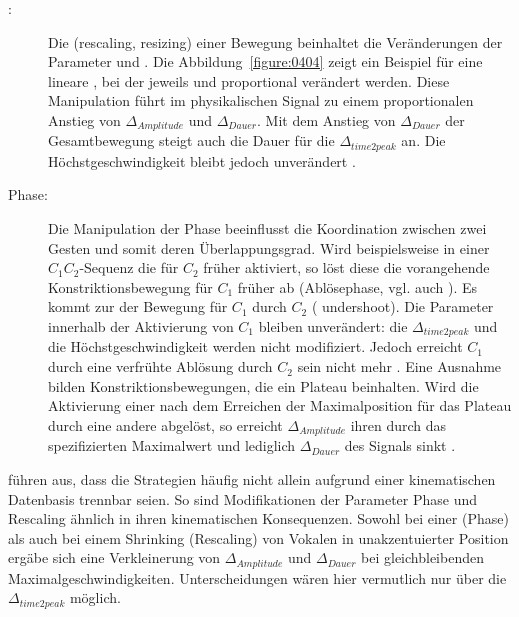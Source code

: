 \begin{description}
	\item[:] Die  (rescaling, resizing) einer Bewegung beinhaltet die Veränderungen der Parameter 
	und . Die Abbildung~\ref{figure:0404} zeigt ein Beispiel für eine lineare , bei der jeweils  und  proportional verändert werden. Diese Manipulation führt im physikalischen Signal zu einem proportionalen Anstieg von ${\Delta}_{{Amplitude}}$ und ${\Delta}_{{Dauer}}$. Mit dem Anstieg von ${\Delta}_{{Dauer}}$ der Gesamtbewegung steigt auch die Dauer für die  ${\Delta}_{{time}2{peak}}$ an. Die Höchstgeschwindigkeit  bleibt jedoch unverändert \citep{Cho2002a, Cho2006, Byrd2000b}.
\end{description}


\begin{description}
	\item[Phase:] Die Manipulation der Phase beeinflusst die Koordination zwischen zwei Gesten und somit deren Überlappungsgrad. Wird beispielsweise in einer  ${C}_{1}{C}_{2}${}-Sequenz die  für ${C}_{2}$ früher aktiviert, so löst diese die vorangehende Konstriktionsbewegung für ${C}_{1}$ früher ab (Ablösephase, vgl. auch \citealt{Kröger1998}). Es kommt zur  der Bewegung für ${C}_{1}$ durch ${C}_{2}$ ( undershoot). Die Parameter innerhalb der Aktivierung von ${C}_{1}$ bleiben unverändert: die  ${\Delta} _{{time}2{peak}}$ und die Höchstgeschwindigkeit  werden nicht modifiziert. Jedoch erreicht ${C}_{1}$ durch eine verfrühte Ablösung durch ${C}_{2}$ sein  nicht mehr \citep{Beckman1992, Harrington1995}. Eine Ausnahme bilden Konstriktionsbewegungen, die ein Plateau beinhalten. Wird die Aktivierung einer  nach dem Erreichen der Maximalposition für das Plateau durch eine andere  abgelöst, so erreicht ${\Delta}_{{Amplitude}}$ ihren durch das  spezifizierten Maximalwert und lediglich ${\Delta}_{{Dauer}}$ des Signals sinkt \citep{Byrd2000b, Cho2002a, Cho2006}.
\end{description}
 
\clearpage  
\citet{Harrington1995} führen aus, dass die Strategien häufig nicht allein aufgrund einer kinematischen Datenbasis trennbar seien. So sind Modifikationen der Parameter Phase und Rescaling ähnlich in ihren kinematischen Konsequenzen. Sowohl bei einer  (Phase) als auch bei einem Shrinking (Rescaling) von Vokalen in unakzentuierter Position ergäbe sich eine Verkleinerung von ${\Delta}_{{Amplitude}}$ und ${\Delta}_{{Dauer}}$ bei gleichbleibenden Maximalgeschwindigkeiten. Unterscheidungen wären hier vermutlich nur über die  ${\Delta}_{{time}2{peak}}$ möglich.

